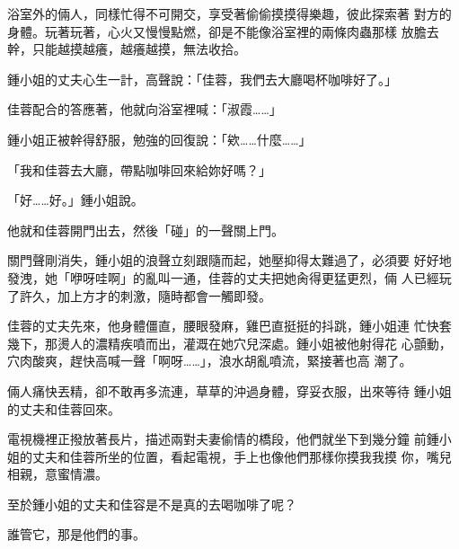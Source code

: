 浴室外的倆人，同樣忙得不可開交，享受著偷偷摸摸得樂趣，彼此探索著
對方的身體。玩著玩著，心火又慢慢點燃，卻是不能像浴室裡的兩條肉蟲那樣
放膽去幹，只能越摸越癢，越癢越摸，無法收拾。

鍾小姐的丈夫心生一計，高聲說：「佳蓉，我們去大廳喝杯咖啡好了。」

佳蓉配合的答應著，他就向浴室裡喊：「淑霞……」

鍾小姐正被幹得舒服，勉強的回復說：「欸……什麼……」

「我和佳蓉去大廳，帶點咖啡回來給妳好嗎？」

「好……好。」鍾小姐說。

他就和佳蓉開門出去，然後「碰」的一聲關上門。

關門聲剛消失，鍾小姐的浪聲立刻跟隨而起，她壓抑得太難過了，必須要
好好地發洩，她「咿呀哇啊」的亂叫一通，佳蓉的丈夫把她肏得更猛更烈，倆
人已經玩了許久，加上方才的刺激，隨時都會一觸即發。

佳蓉的丈夫先來，他身體僵直，腰眼發麻，雞巴直挺挺的抖跳，鍾小姐連
忙快套幾下，那燙人的濃精疾噴而出，灌溉在她穴兒深處。鍾小姐被他射得花
心顫動，穴肉酸爽，趕快高喊一聲「啊呀……」，浪水胡亂噴流，緊接著也高
潮了。

倆人痛快丟精，卻不敢再多流連，草草的沖過身體，穿妥衣服，出來等待
鍾小姐的丈夫和佳蓉回來。

電視機裡正撥放著長片，描述兩對夫妻偷情的橋段，他們就坐下到幾分鐘
前鍾小姐的丈夫和佳蓉所坐的位置，看起電視，手上也像他們那樣你摸我我摸
你，嘴兒相親，意蜜情濃。

至於鍾小姐的丈夫和佳容是不是真的去喝咖啡了呢？

誰管它，那是他們的事。










